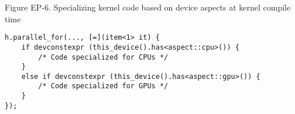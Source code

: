 \hspace*{\fill} \par %
Figure EP-6. Specializing kernel code based on device aspects at kernel compile time
\begin{lstlisting}[caption={}]
h.parallel_for(..., [=](item<1> it) {
	if devconstexpr (this_device().has<aspect::cpu>()) {
		/* Code specialized for CPUs */
	}
	else if devconstexpr (this_device().has<aspect::gpu>()) {
		/* Code specialized for GPUs */
	}
});
\end{lstlisting}






















































